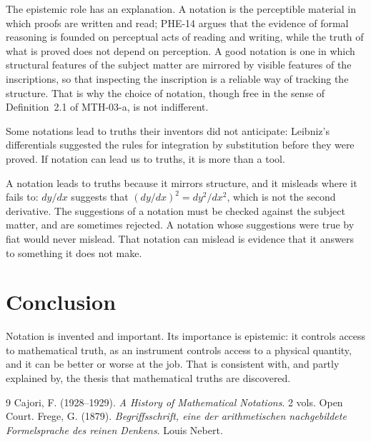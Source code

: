 \documentclass{situationist-preprint}
\begin{document}
The epistemic role has an explanation. A notation is the perceptible material in which proofs are written and read; PHE-14 argues that the evidence of formal reasoning is founded on perceptual acts of reading and writing, while the truth of what is proved does not depend on perception. A good notation is one in which structural features of the subject matter are mirrored by visible features of the inscriptions, so that inspecting the inscription is a reliable way of tracking the structure. That is why the choice of notation, though free in the sense of Definition~2.1 of MTH-03-a, is not indifferent.

\begin{objection}
Some notations lead to truths their inventors did not anticipate: Leibniz's differentials suggested the rules for integration by substitution before they were proved. If notation can lead us to truths, it is more than a tool.
\end{objection}

\begin{reply}
A notation leads to truths because it mirrors structure, and it misleads where it fails to: $dy/dx$ suggests that $(dy/dx)^2 = dy^2/dx^2$, which is not the second derivative. The suggestions of a notation must be checked against the subject matter, and are sometimes rejected. A notation whose suggestions were true by fiat would never mislead. That notation can mislead is evidence that it answers to something it does not make.
\end{reply}

\section{Conclusion}

Notation is invented and important. Its importance is epistemic: it controls access to mathematical truth, as an instrument controls access to a physical quantity, and it can be better or worse at the job. That is consistent with, and partly explained by, the thesis that mathematical truths are discovered.

\begin{thebibliography}{9}\small
{} Cajori, F. (1928--1929). \emph{A History of Mathematical Notations}. 2 vols. Open Court.
 Frege, G. (1879). \emph{Begriffsschrift, eine der arithmetischen nachgebildete Formelsprache des reinen Denkens}. Louis Nebert.
\end{thebibliography}
\end{document}
